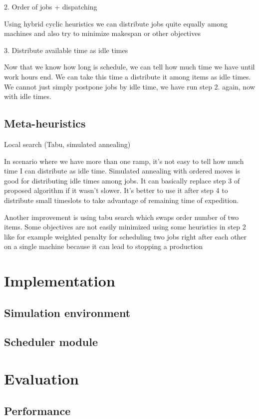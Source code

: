 \documentclass{ctuthesis}
\begin{document}
2. Order of jobs + dispatching

Using hybrid cyclic heuristics we can distribute jobs quite equally among machines and also try to minimize makespan or other objectives

3. Distribute available time as idle times

Now that we know how long is schedule, we can tell how much time we have until work hours end. We can take this time a distribute it among items as idle times. We cannot just simply postpone jobs by idle time, we have run step 2. again, now with idle times.

\section{Meta-heuristics}
Local search (Tabu, simulated annealing)

In scenario where we have more than one ramp, it's not easy to tell how much time I can distribute as idle time. Simulated annealing with ordered moves is good for distributing idle times among jobs. It can basically replace step 3 of proposed algorithm if it wasn't slower. It's better to use it after step 4 to distribute small timeslots to take advantage of remaining time of expedition.

Another improvement is using tabu search which swaps order number of two items. Some objectives are not easily minimized using some heuristics in step 2 like for example weighted penalty for scheduling two jobs right after each other on a single machine because it can lead to stopping a production

\chapter{Implementation}
\section{Simulation environment}
\section{Scheduler module}
\chapter{Evaluation}
\label{ch:Evaluation}
\section{Performance}
\end{document}
